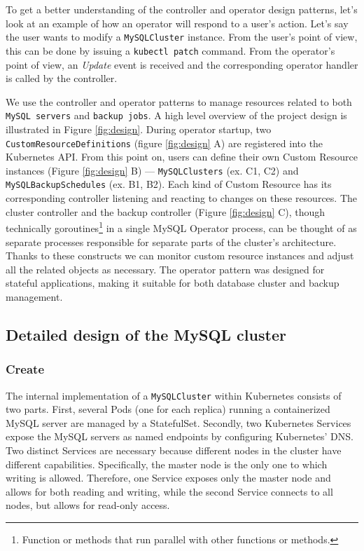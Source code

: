To get a better understanding of the controller and operator design patterns, let’s look at an
example of how an operator will respond to a user’s action. Let’s say the user wants to modify a
\texttt{MySQLCluster} instance. From the user’s point of view, this can be done by issuing a
\texttt{kubectl patch} command. From the operator’s point of view, an \textit{Update} event is
received and the corresponding operator handler is called by the controller.

We use the controller and operator patterns to manage resources related to both 
\texttt{MySQL servers} and \texttt{backup jobs}. A high level overview of the project design is
illustrated in Figure \ref{fig:design}. During operator startup, two
\texttt{CustomResourceDefinitions} (figure \ref{fig:design} A) are registered into the Kubernetes API.
From this point on, users can define their own Custom Resource instances (Figure \ref{fig:design} B) ---
\texttt{MySQLClusters} (ex. C1, C2) and \texttt{MySQLBackupSchedules} (ex. B1, B2). Each kind of
Custom Resource has its corresponding controller listening and reacting to changes on these
resources. The cluster controller and the backup controller (Figure \ref{fig:design} C), though technically
goroutines\footnote{Function or methods that run parallel with other functions or methods.} in a single
MySQL Operator process, can be thought of as separate processes responsible for separate parts of the
cluster’s architecture. Thanks to these constructs we can monitor custom resource instances and adjust
all the related objects as necessary. The operator pattern was designed for stateful applications, making
it suitable for both database cluster and backup management.~\cite{coreos}

\subsection{Detailed design of the MySQL cluster}

\subsubsection*{Create}
The internal implementation of a \texttt{MySQLCluster} within Kubernetes consists of two parts. First,
several Pods (one for each replica) running a containerized MySQL server are managed by a
StatefulSet. Secondly, two Kubernetes Services expose the MySQL servers as named endpoints by
configuring Kubernetes’ DNS. Two distinct Services are necessary because different nodes in the
cluster have different capabilities. Specifically, the master node is the only one to which writing
is allowed. Therefore, one Service exposes only the  master node and allows for both reading and
writing, while the second Service connects to all nodes, but allows for read-only access. 

